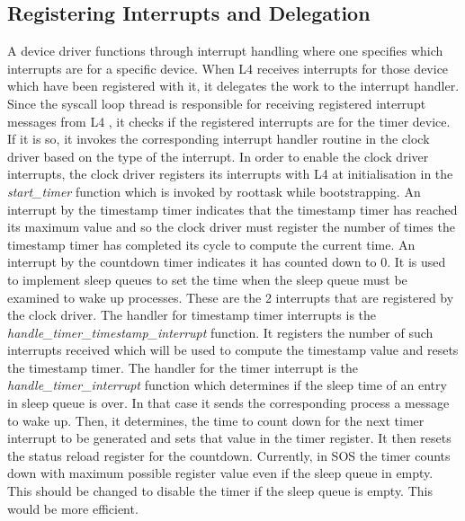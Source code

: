 \documentclass[a4paper, 11pt]{article}
\begin{document}
\subsection{Registering Interrupts and Delegation}
A device driver functions through interrupt handling where one
specifies which interrupts are for a specific device. When L4 receives
interrupts for those device which have been registered with it, it
delegates the work to the interrupt handler. Since the syscall loop
thread is responsible for receiving registered interrupt messages from
L4 , it checks if the registered interrupts are for the timer
device. If it is so, it invokes the corresponding interrupt handler
routine in the clock driver based on the type of the interrupt. In
order to enable the clock driver interrupts, the clock driver
registers its interrupts with L4 at initialisation in the
\textit{start\_timer} function which is invoked by roottask while
bootstrapping. An interrupt by the timestamp timer indicates that the
timestamp timer has reached its maximum value and so the clock driver
must register the number of times the timestamp timer has completed
its cycle to compute the current time. An interrupt by the countdown
timer indicates it has counted down to 0. It is used to implement
sleep queues to set the time when the sleep queue must be examined to
wake up processes. These are the 2 interrupts that are registered by
the clock driver. The handler for timestamp timer interrupts is the
\textit{handle\_timer\_timestamp\_interrupt} function. It registers
the number of such interrupts received which will be used to compute
the timestamp value and resets the timestamp timer. The handler for
the timer interrupt is the \textit{handle\_timer\_interrupt} function
which determines if the sleep time of an entry in sleep queue is
over. In that case it sends the corresponding process a message to
wake up. Then, it determines, the time to count down for the next
timer interrupt to be generated and sets that value in the timer
register. It then resets the status reload register for the
countdown. Currently, in SOS the timer counts down with maximum
possible register value even if the sleep queue in empty. This should
be changed to disable the timer if the sleep queue is empty. This
would be more efficient.
\end{document}
